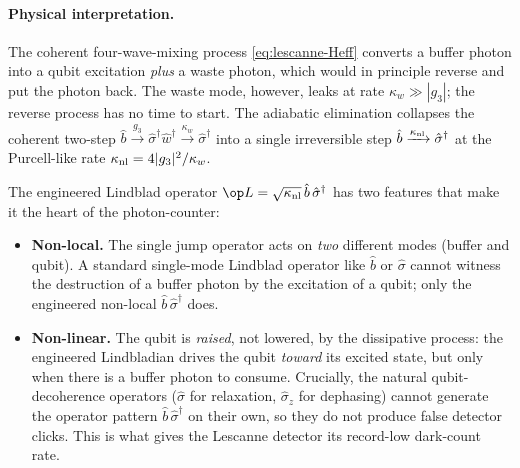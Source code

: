 \paragraph{Physical interpretation.}
The coherent four-wave-mixing process \cref{eq:lescanne-Heff}
converts a buffer photon into a qubit excitation \emph{plus} a
waste photon, which would in principle reverse and put the photon
back. The waste mode, however, leaks at rate $\kappa_w\gg|g_3|$;
the reverse process has no time to start. The adiabatic elimination
collapses the coherent two-step
$\hat b\xrightarrow{g_3}\hat\sigma^\dagger\hat w^\dagger
\xrightarrow{\kappa_w}\hat\sigma^\dagger$
into a single irreversible step
$\hat b\xrightarrow{\kappa_{\rm nl}}\hat\sigma^\dagger$
at the Purcell-like rate $\kappa_{\rm nl}=4|g_3|^2/\kappa_w$.

The engineered Lindblad operator
$\op L=\sqrt{\kappa_{\rm nl}}\,\hat b\,\hat\sigma^\dagger$
has two features that make it the heart of the photon-counter:
\begin{itemize}
  \item \textbf{Non-local.} The single jump operator acts on
        \emph{two} different modes (buffer and qubit). A standard
        single-mode Lindblad operator like $\hat b$ or $\hat\sigma$
        cannot witness the destruction of a buffer photon by
        the excitation of a qubit; only the engineered non-local
        $\hat b\,\hat\sigma^\dagger$ does.
  \item \textbf{Non-linear.} The qubit is \emph{raised}, not
        lowered, by the dissipative process: the engineered
        Lindbladian drives the qubit \emph{toward} its excited
        state, but only when there is a buffer photon to consume.
        Crucially, the natural qubit-decoherence operators
        ($\hat\sigma$ for relaxation, $\hat\sigma_z$ for
        dephasing) cannot generate the operator pattern
        $\hat b\,\hat\sigma^\dagger$ on their own, so they do
        not produce false detector clicks. This is what gives
        the Lescanne detector its record-low dark-count rate.
\end{itemize}

